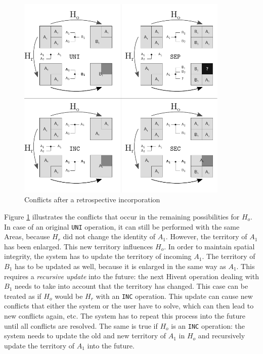 \begin{figure}[ht]
\vspace{1em}
  \centering
  \includegraphics[width=0.9\textwidth]{graphics/development/editing_hivent_data/retrospective_updates/INC}
  \caption{Conflicts after a retrospective incorporation}
  \label{fig:update_conflict_INC}
\end{figure}

Figure \ref{fig:update_conflict_INC} illustrates the conflicts that occur in the remaining possibilities for $H_o$. In case of an original \texttt{UNI} operation, it can still be performed with the same Areas, because $H_r$ did not change the identity of $A_1$. However, the territory of $A_1$ has been enlarged. This new territory influences $H_o$. In order to maintain spatial integrity, the system has to update the territory of incoming $A_1$. The territory of $B_1$ has to be updated as well, because it is enlarged in the same way as $A_1$. This requires a \emph{recursive update} into the future: the next Hivent operation dealing with $B_1$ needs to take into account that the territory has changed. This case can be treated as if $H_o$ would be $H_r$ with an \texttt{INC} operation. This update can cause new conflicts that either the system or the user have to solve, which can then lead to new conflicts again, etc. The system has to repeat this process into the future until all conflicts are resolved. The same is true if $H_o$ is an \texttt{INC} operation: the system needs to update the old and new territory of $A_1$ in $H_o$ and recursively update the territory of $A_1$ into the future.

